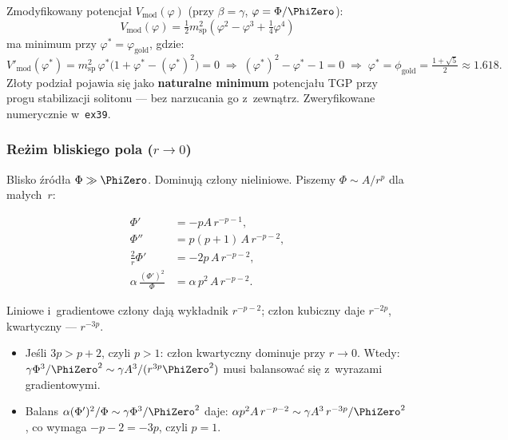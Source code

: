 \begin{proposition}%
\label{prop:golden-ratio}
Zmodyfikowany potencja\l{} $V_{\mathrm{mod}}(\varphi)$ (przy $\beta=\gamma$,
$\varphi = \Phi/\PhiZero$):
\begin{equation}
  V_{\mathrm{mod}}(\varphi) = \tfrac{1}{2}m_{\mathrm{sp}}^2
  \left(\varphi^2 - \varphi^3 + \tfrac{1}{4}\varphi^4\right)
\end{equation}
ma minimum przy $\varphi^* = \varphi_{\mathrm{gold}}$, gdzie:
\begin{equation}\label{eq:golden-ratio-V}
  V'_{\mathrm{mod}}(\varphi^*)
  = m_{\mathrm{sp}}^2\,\varphi^*\bigl(1 + \varphi^* - (\varphi^*)^2\bigr)
  = 0
  \;\Longrightarrow\;
  (\varphi^*)^2 - \varphi^* - 1 = 0
  \;\Longrightarrow\;
  \boxed{\varphi^* = \phi_{\mathrm{gold}} = \tfrac{1+\sqrt{5}}{2}
  \approx 1.618.}
\end{equation}
Z\l{}oty podzia\l{} pojawia si\k{e} jako \textbf{naturalne minimum}
potencja\l{}u TGP przy progu stabilizacji solitonu --- bez narzucania
go z~zewn\k{a}trz.  Zweryfikowane numerycznie w~\texttt{ex39}.
\end{proposition}

\subsubsection{Re\.zim bliskiego pola ($r \to 0$)}

Blisko \'zr\'od\l{}a $\Phi \gg \PhiZero$. Dominuj\k{a} cz\l{}ony
nieliniowe. Piszemy $\Phi \sim A/r^p$ dla ma\l{}ych~$r$:

\begin{align}
  \Phi' &= -pA\,r^{-p-1}, \\
  \Phi'' &= p(p+1)\,A\,r^{-p-2}, \\
  \tfrac{2}{r}\Phi' &= -2p\,A\,r^{-p-2}, \\
  \alpha\,\frac{(\Phi')^2}{\Phi}
    &= \alpha\,p^2\,A\,r^{-p-2}.
\end{align}

Liniowe i~gradientowe cz\l{}ony daj\k{a} wyk\l{}adnik $r^{-p-2}$;
cz\l{}on kubiczny daje $r^{-2p}$, kwartyczny --- $r^{-3p}$.

\begin{itemize}[nosep]
  \item Je\'sli $3p > p+2$, czyli $p > 1$: cz\l{}on kwartyczny
    dominuje przy $r\to 0$. Wtedy: $\gamma\Phi^3/\PhiZero^2 \sim
    \gamma A^3/(r^{3p}\PhiZero^2)$ musi balansowa\'c si\k{e} z~wyrazami
    gradientowymi.
  \item Balans $\alpha(\Phi')^2/\Phi \sim \gamma\Phi^3/\PhiZero^2$
    daje: $\alpha p^2 A\,r^{-p-2} \sim \gamma A^3\,r^{-3p}/\PhiZero^2$,
    co wymaga $-p-2 = -3p$, czyli $p = 1$.
\end{itemize}

